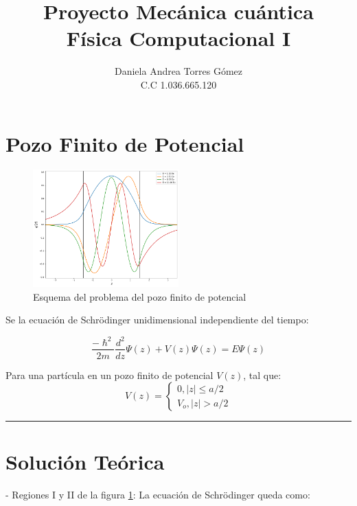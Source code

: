 \documentclass[a4paper]{article}
\title{Proyecto Mecánica cuántica\\ Física Computacional I}
\author{Daniela Andrea Torres Gómez\\ C.C 1.036.665.120

}
\date{}
\theoremstyle{definition}
\theoremstyle{plain}
\begin{document}
\maketitle



\section*{Pozo Finito de Potencial}

\begin{figure}
\begin {center}
\includegraphics[width=0.50\textwidth]{finitewall.png}
\caption{Esquema del problema del pozo finito de potencial}

\label{fig:finitewall}
\end {center}
\end{figure}

Se la ecuación de Schrödinger unidimensional independiente del tiempo:

\begin{equation}
    \frac{-\hslash^2}{2m} \frac{d^2}{dz} \Psi(z) + V(z) \Psi(z) = E \Psi(z)
    \label{ec_1}
\end{equation}

Para una partícula en un pozo finito de potencial $V(z)$, tal que:
\\
$$V(z) = 
\begin{cases}
0, |z| \leq a/2 \\
V_o, |z| > a/2
\end{cases}
$$


\rule{145 mm}{0.1 mm}

\section{Solución Teórica}
- Regiones I y II de la figura \ref{fig:finitewall}:
La ecuación de Schrödinger queda como: 
\end{document}
